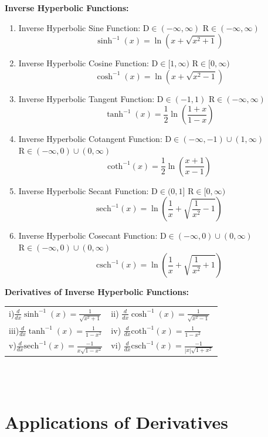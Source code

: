 \documentclass[14pt]{article}
\begin{document}
    \textbf{Inverse Hyperbolic Functions:}\\
    \begin{enumerate}
        \item Inverse Hyperbolic Sine Function: $\mathrm{D}\in(-\infty,
        \infty)$ $\mathrm{R}\in(-\infty, \infty)$
        $$\sinh^{-1}(x)=\ln(x+\sqrt{x^2+1}) $$
        \item Inverse Hyperbolic Cosine Function: $\mathrm{D}\in[1,
        \infty)$ $\mathrm{R}\in[0, \infty)$
        $$\cosh^{-1}(x)=\ln(x+\sqrt{x^2-1})$$
        \item Inverse Hyperbolic Tangent Function: $\mathrm{D}\in(-1,
        1)$ $\mathrm{R}\in(-\infty, \infty)$
        $$\tanh^{-1}(x)=\frac{1}{2}\ln\left(\frac{1+x}{1-x}\right)$$
        \item Inverse Hyperbolic Cotangent Function:
        $\mathrm{D}\in(-\infty, -1)\cup(1, \infty) $
        $\mathrm{R}\in(-\infty,0)\cup(0, \infty)$
        $$\mathrm{coth}^{-1}(x)=\frac{1}{2}\ln\left(\frac{x+1}{x-1}\right)$$
        \item Inverse Hyperbolic Secant Function: $\mathrm{D}\in(0, 1]$
        $\mathrm{R}\in[0, \infty)$
        $$\mathrm{sech}^{-1}(x)=\ln\left(\frac{1}{x}+\sqrt{\frac{1}{x^2}-1}\right)$$
        \item Inverse Hyperbolic Cosecant Function:
        $\mathrm{D}\in(-\infty,0)\cup(0, \infty)$
        $\mathrm{R}\in(-\infty,0)\cup(0, \infty)$
        $$\mathrm{csch}^{-1}(x)=\ln\left(\frac{1}{x}+\sqrt{\frac{1}{x^2}+1}\right)$$
    \end{enumerate}
    \textbf{Derivatives of Inverse Hyperbolic Functions:}\\
    \begin{tabular}{p{5cm}p{5cm}}
        i)$\frac{d}{dx}\sinh^{-1}(x)=\frac{1}{\sqrt{x^2+1}}$ & ii)
        $\frac{d}{dx}\cosh^{-1}(x)=\frac{1}{\sqrt{x^2-1}}$\\
        iii)$\frac{d}{dx}\tanh^{-1}(x)=\frac{1}{1-x^2}$ & iv)
        $\frac{d}{dx}\mathrm{coth}^{-1}(x)=\frac{1}{1-x^2}$\\
        v)$\frac{d}{dx}\mathrm{sech}^{-1}(x)=\frac{-1}{x\sqrt{1-x^2}}$ &
        vi)
        $\frac{d}{dx}\mathrm{csch}^{-1}(x)=\frac{-1}{|x|\sqrt{1+x^2}}$\\
    \end{tabular}\\\\
    \section{Applications of Derivatives}
\end{document}
